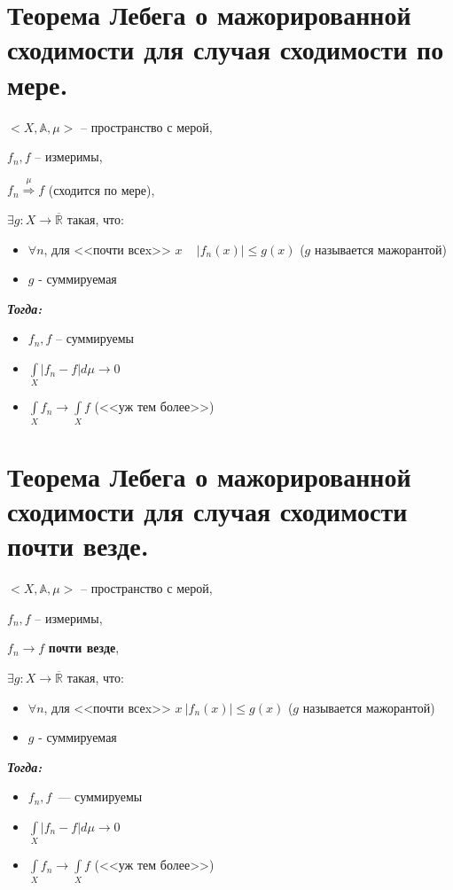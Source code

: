 \documentclass[paper=a4, fontsize=14pt]{report}
\begin{document}
\section{Теорема Лебега о мажорированной сходимости для случая сходимости по мере.}
\begin{flushleft}

$<X, \mathds{A}, \mu>$ -- пространство с мерой,

$f_n, f$ -- измеримы,

$f_n\stackrel{\mu}{\Rightarrow}f$ (сходится по мере),

$\exists g : X \rightarrow \overline{\mathds{R}}$ такая, что:
\begin{itemize}
\item
$\forall n$,  для <<почти всеx>> $x$ ~ $|f_n(x)| \leq g(x)$ ($g$ называется мажорантой)
\item
$g$ - суммируемая
\end{itemize}

\emph{\textbf{Тогда:}}
\begin{itemize}
    \item $f_n, f$ -- суммируемы
    \item $\int\limits_{X} |f_n - f| d\mu \rightarrow 0$
    \item $\int\limits_{X} f_n \rightarrow \int\limits_{X} f$ (<<уж тем более>>)
\end{itemize}
\end{flushleft}

\section{Теорема Лебега о мажорированной сходимости для случая сходимости почти везде.}
$<X, \mathds{A}, \mu>$ -- пространство с мерой,

$f_n, f$ -- измеримы,

$f_n \rightarrow f$ \textbf{почти везде},

$\exists g : X \rightarrow \overline{\mathds{R}}$ такая, что:
\begin{itemize}
\item
$\forall n$,  для <<почти всеx>> $x ~ |f_n(x)| \leq g(x)$ ($g$ называется мажорантой)
\item
$g$ - суммируемая
\end{itemize}

\emph{\textbf{Тогда:}}
\begin{itemize}
    \item $f_n, f$~--- суммируемы
    \item $\int\limits_{X} |f_n - f| d\mu \rightarrow 0$
    \item $\int\limits_{X} f_n \rightarrow \int\limits_{X} f$ (<<уж тем более>>)
\end{itemize}
\end{document}
